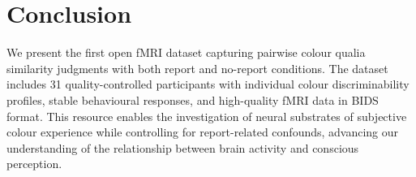\documentclass[11pt]{article}
\begin{document}
\section{Conclusion}

We present the first open fMRI dataset capturing pairwise colour qualia similarity judgments with both report and no-report conditions. The dataset includes 31 quality-controlled participants with individual colour discriminability profiles, stable behavioural responses, and high-quality fMRI data in BIDS format. This resource enables the investigation of neural substrates of subjective colour experience while controlling for report-related confounds, advancing our understanding of the relationship between brain activity and conscious perception.



\end{document}
